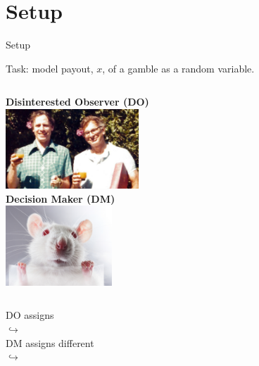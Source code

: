 \section{Setup}
\begin{frame}{Setup}
\begin{center}
Task: model payout, $x$, of a gamble as a random variable.
\end{center}
\begin{columns}[T]
	\centering
	\textbf{Disinterested Observer (DO)} \\
	\vspace{0.5em}
	\includegraphics[height=3cm]{img/TverskyKahnemanFunny} \\
	\vspace{0.5em}
	\centering
	\textbf{Decision Maker (DM)} \\
	\vspace{0.5em}
	\includegraphics[height=3cm]{img/LabRat} \\
	\vspace{0.5em}
\end{columns}

\begin{columns}[T]
	\vspace{1em}
	DO assigns  \\
  $\hookrightarrow$ \\
	\vspace{1em}
  DM assigns different \\
  $\hookrightarrow$ \\
\end{columns}
\end{frame}


